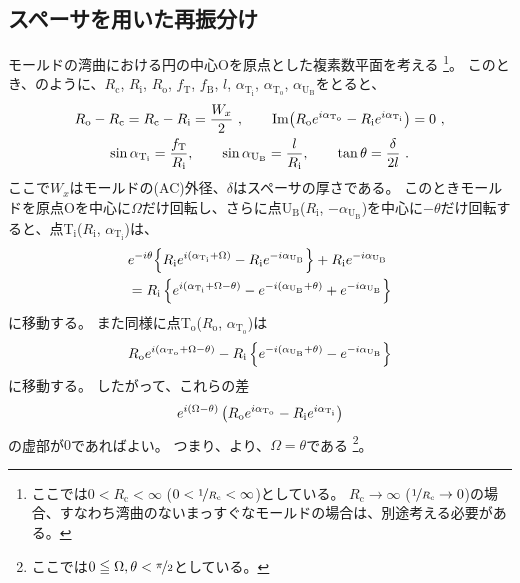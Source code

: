 \subsection{スペーサを用いた再振分け}
モールドの湾曲における円の中心Oを原点とした複素数平面を考える
\footnote{ここでは$0 < R_\mathrm c < \infty$ ($0 < \nicefrac1{R_\mathrm c} < \infty$)としている。
$R_\mathrm c \to \infty$ ($\nicefrac1{R_\mathrm c} \to 0$)の場合、すなわち湾曲のないまっすぐなモールドの場合は、別途考える必要がある。}。
このとき、のように、$R_\mathrm c$, $R_\mathrm i$, $R_\mathrm o$, $f_\mathrm T$, $f_\mathrm B$, $l$, $\alpha_{\mathrm T_\mathrm i}$, $\alpha_{\mathrm T_\mathrm o}$, $\alpha_{\mathrm U_\mathrm B}$をとると、
\begin{subequations}
\begin{gather}
  \label{eq:constraintUpoint1}
  R_\mathrm o - R_\mathrm c = R_\mathrm c - R_\mathrm i = \frac{W_x}2~, \qquad
  \operatorname{Im}\!\left(R_\mathrm oe^{i\alpha_{\mathrm T_\mathrm o}} - R_\mathrm ie^{i\alpha_{\mathrm T_\mathrm i}}\right)
  = 0~,\\
  \label{eq:constraintUpoint2}
  \sin\alpha_{\mathrm T_\mathrm i} = \frac{f_\mathrm T}{R_\mathrm i}, \qquad
  \sin\alpha_{\mathrm U_\mathrm B} = \frac l{R_\mathrm i}, \qquad
  \tan\theta = \frac\delta{2l}~.
\end{gather}
\end{subequations}
ここで$W_x$はモールドの(AC)外径、$\delta$はスペーサの厚さである。
このときモールドを原点Oを中心に$\Omega$だけ回転し、さらに点U$_\mathrm B$($R_\mathrm i$, $-\alpha_{\mathrm U_\mathrm B}$)を中心に$-\theta$だけ回転すると、点T$_\mathrm i$($R_\mathrm i$, $\alpha_{\mathrm T_\mathrm i}$)は、
\begin{align}
  \notag
  & e^{-i\theta}\!\left\{R_\mathrm ie^{i(\alpha_{\mathrm T_\mathrm i} + \Omega)} - R_\mathrm ie^{-i\alpha_{\mathrm U_\mathrm B}}\right\}
    +R_\mathrm ie^{-i\alpha_{\mathrm U_\mathrm B}}\\
  &= R_\mathrm i
     \left\{
       e^{i(\alpha_{\mathrm T_\mathrm i} + \Omega - \theta)} - e^{-i(\alpha_{\mathrm U_\mathrm B} + \theta)} + e^{-i\alpha_{\mathrm U_\mathrm B}}
     \right\}
  \label{eq:afterftUpoint}
\end{align}
に移動する。
また同様に点T$_\mathrm o$($R_\mathrm o$, $\alpha_{\mathrm T_\mathrm o}$)は
\begin{align*}
  \notag
  R_\mathrm oe^{i(\alpha_{\mathrm T_\mathrm o} + \Omega - \theta)}
  -R_\mathrm i\left\{e^{-i(\alpha_{\mathrm U_\mathrm B} + \theta)}-e^{-i\alpha_{\mathrm U_\mathrm B}}\right\}
\end{align*}
に移動する。
したがって、これらの差
\begin{align*}
  \notag
  e^{i(\Omega - \theta)}\left(R_\mathrm oe^{i\alpha_{\mathrm T_\mathrm o}} - R_\mathrm ie^{i\alpha_{\mathrm T_\mathrm i}}\right)
\end{align*}
の虚部が$0$であればよい。
つまり、より、$\Omega = \theta$である
\footnote{ここでは$0 \leqq \Omega, \theta < \nicefrac \pi2$としている。}。

